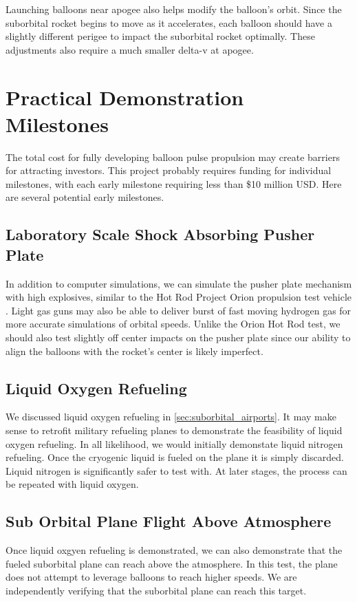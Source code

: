 \documentclass{article}
\begin{document}
Launching balloons near apogee also helps modify the balloon's orbit.   Since the suborbital rocket begins to move as it accelerates, each balloon should have a slightly different perigee to impact the suborbital rocket optimally.   These adjustments also require a much smaller delta-v at apogee.

\section{Practical Demonstration Milestones}\label{sec:milestones}
The total cost for fully developing balloon pulse propulsion may create barriers for attracting investors.  This project probably requires funding for individual milestones, with each early milestone requiring less than \$10 million USD.    Here are several potential early milestones.

\subsection{Laboratory Scale Shock Absorbing Pusher Plate}\label{sec:lab_scale_pusher_plate}    
In addition to computer simulations, we can simulate the pusher plate mechanism with high explosives, similar to the Hot Rod Project Orion propulsion test vehicle \cite{orion_hot_rod}.    Light gas guns may also be able to deliver burst of fast moving hydrogen gas for more accurate simulations of orbital speeds.    Unlike the Orion Hot Rod test, we should also test slightly off center impacts on the pusher plate since our ability to align the balloons with the rocket's center is likely imperfect.

\subsection{Liquid Oxygen Refueling} \label{sec:lox_milestone}
We discussed liquid oxygen refueling in \autoref{sec:suborbital_airports}.   It may make sense to retrofit military refueling planes to demonstrate the feasibility of liquid oxygen refueling.  In all likelihood, we would initially demonstate liquid nitrogen refueling.   Once the cryogenic liquid is fueled on the plane it is simply discarded.   Liquid nitrogen is significantly safer to test with.   At later stages, the process can be repeated with liquid oxygen.   

\subsection{Sub Orbital Plane Flight Above Atmosphere}\label{sec:suborbital_plane_milestone}
Once liquid oxgyen refueling is demonstrated, we can also demonstrate that the fueled suborbital plane can reach above the atmosphere.   In this test, the plane does not attempt to leverage balloons to reach higher speeds.   We are independently verifying that the suborbital plane can reach this target.



  
  
\end{document}
